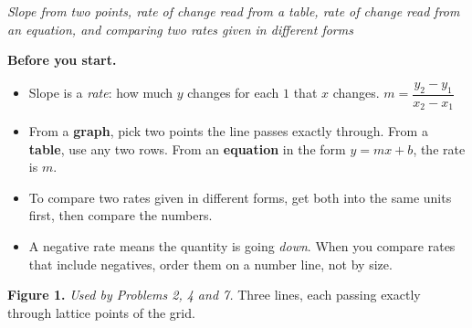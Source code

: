 \documentclass[12pt]{article}
\begin{document}

\begin{center}
\textit{Slope from two points, rate of change read from a table, rate of change
read from an equation, and comparing two rates given in different forms}
\end{center}

\noindent\textbf{Before you start.}
\begin{itemize}[leftmargin=1.2cm, itemsep=2pt, topsep=2pt]
\item Slope is a \emph{rate}: how much $y$ changes for each $1$ that $x$
changes. \quad $m = \dfrac{y_2 - y_1}{x_2 - x_1}$
\item From a \textbf{graph}, pick two points the line passes exactly through.
From a \textbf{table}, use any two rows. From an \textbf{equation} in the form
$y = mx + b$, the rate is $m$.
\item To compare two rates given in different forms, get both into the same
units first, then compare the numbers.
\item A negative rate means the quantity is going \emph{down}. When you compare
rates that include negatives, order them on a number line, not by size.
\end{itemize}

\bigskip
\noindent\textbf{Figure 1.} \textit{Used by Problems 2, 4 and 7.} Three lines,
each passing exactly through lattice points of the grid.

\begin{center}
\end{center}

\bigskip
\end{document}
